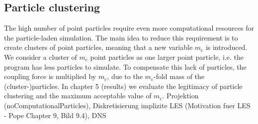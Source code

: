 \documentclass[a4paper,12pt]{article}
\numberwithin{equation}{section} %
\begin{document}
\subsection{Particle clustering}
The high number of point particles require even more computational resources for the particle-laden simulation. The main idea to reduce this requirement is to create clusters of point particles, meaning that a new variable $m_\mathrm{c}$ is introduced. We consider a cluster of $m_\mathrm{c}$ point particles as one larger point particle, i.e. the program has less particles to simulate. To compensate this lack of particles, the coupling force is multiplied by $m_\mathrm{c}$, due to the $m_\mathrm{c}$-fold mass of the (cluster-)particles. In chapter 5 (results) we evaluate the legitimacy of particle clustering and the maximum acceptable value of $m_\mathrm{c}$.
\newline
\newline
Projektion (noComputationalParticles), Diskretisierung
implizite LES (Motivation fuer LES -  Pope Chapter 9, Bild 9.4), DNS
\pagebreak
\end{document}
